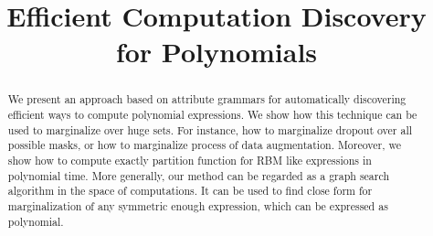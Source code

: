\documentclass[]{article}
\title{Efficient Computation Discovery for Polynomials}
\numberwithin{equation}{section}
\begin{document}
 

\maketitle





 

\begin{abstract} We present an approach based on attribute grammars
  for automatically discovering efficient ways to compute polynomial
  expressions. We show how this technique can be used to marginalize
  over huge sets. For instance, how to marginalize dropout over
  all possible masks, or how to marginalize process of data augmentation.   
  Moreover, we show how to compute exactly partition function for RBM like
  expressions in polynomial time. More generally, our method can be regarded as
  a graph search algorithm in the space of computations. It can be used
  to find close form for marginalization of any symmetric enough expression, 
  which can be expressed as polynomial.
\end{abstract} 










\nocite{*}


\end{document}
